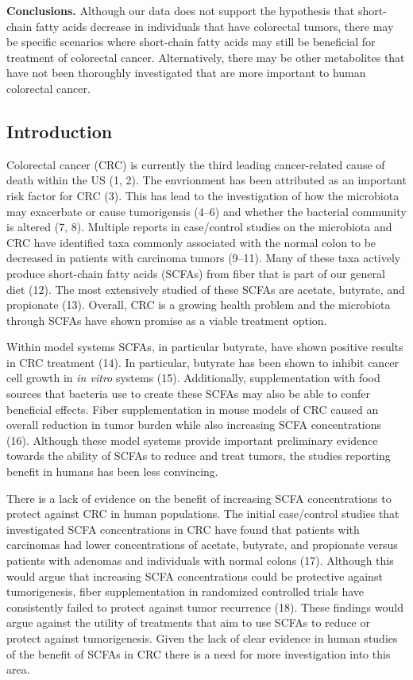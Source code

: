 \documentclass[11pt,]{article}
\begin{document}
\textbf{Conclusions.} Although our data does not support the hypothesis
that short-chain fatty acids decrease in individuals that have
colorectal tumors, there may be specific scenarios where short-chain
fatty acids may still be beneficial for treatment of colorectal cancer.
Alternatively, there may be other metabolites that have not been
thoroughly investigated that are more important to human colorectal
cancer.

\newpage

\subsection{Introduction}\label{introduction}

Colorectal cancer (CRC) is currently the third leading cancer-related
cause of death within the US (1, 2). The envrionment has been attributed
as an important risk factor for CRC (3). This has lead to the
investigation of how the microbiota may exacerbate or cause tumorigensis
(4--6) and whether the bacterial community is altered (7, 8). Multiple
reports in case/control studies on the microbiota and CRC have
identified taxa commonly associated with the normal colon to be
decreased in patients with carcinoma tumors (9--11). Many of these taxa
actively produce short-chain fatty acids (SCFAs) from fiber that is part
of our general diet (12). The most extensively studied of these SCFAs
are acetate, butyrate, and propionate (13). Overall, CRC is a growing
health problem and the microbiota through SCFAs have shown promise as a
viable treatment option.

Within model systems SCFAs, in particular butyrate, have shown positive
results in CRC treatment (14). In particular, butyrate has been shown to
inhibit cancer cell growth in \emph{in vitro} systems (15).
Additionally, supplementation with food sources that bacteria use to
create these SCFAs may also be able to confer beneficial effects. Fiber
supplementation in mouse models of CRC caused an overall reduction in
tumor burden while also increasing SCFA concentrations (16). Although
these model systems provide important preliminary evidence towards the
ability of SCFAs to reduce and treat tumors, the studies reporting
benefit in humans has been less convincing.

There is a lack of evidence on the benefit of increasing SCFA
concentrations to protect against CRC in human populations. The initial
case/control studies that investigated SCFA concentrations in CRC have
found that patients with carcinomas had lower concentrations of acetate,
butyrate, and propionate versus patients with adenomas and individuals
with normal colons (17). Although this would argue that increasing SCFA
concentrations could be protective against tumorigenesis, fiber
supplementation in randomized controlled trials have consistently failed
to protect against tumor recurrence (18). These findings would argue
against the utility of treatments that aim to use SCFAs to reduce or
protect against tumorigenesis. Given the lack of clear evidence in human
studies of the benefit of SCFAs in CRC there is a need for more
investigation into this area.
\end{document}

